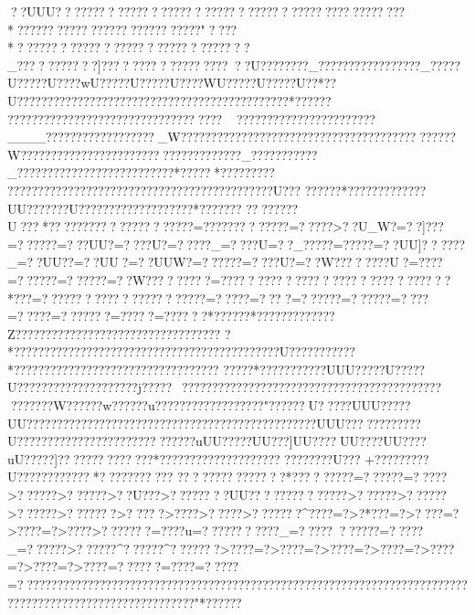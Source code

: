 {{{{{{{{{{{{{{{{{{{{{{{{{{{{{{{{{{{{{{{{{{{{{{{{{{{{{{{{{{{{{{{{{{{{{{{{{{{{{{{{{{{{{{{{{{{{{{{{{{{{{{{{{{{{{{{{{{{{{{{{{{{{{{{{{{{{{{{{{{{{{{{{{{{{{{{{{{{{{{{{{{{{{{{{{{{{{{{{{{{{{{{{{{{{{{{{{{{{{{{{{{{{{{{{{{{{{{{{{{{{{{{{{{{{{{{{{{{{{{{{{{{{{{{{{{{{{{{{{{{{{{{{{{{{{{{{{{{{{{{{{{{{{{{{{{{{{{{{{{{{{{{{{{{{{{{{{{{{{{{{{{{{{{{{{{{{{{{{{{{{{{{{{{{{{{{{{{{{{{{{{{{{{{{{{{{{{{{{{{{{{{{{{{{{{{{{{{{{{{{{{{{{{{{{{{{{{{{{{{{{{{{{{{{{{{{{{{{{{{{{{{{{{{{{{{{{{{{{{{{{{{{{{{{{{{{{{{{{{{{{{{{{{{{{{{{{{{{{{{{{{{{{{{{{{{{{{{{{{{{{{{{{{{{{{{{{{{{{{{{{{{{{{{{{{{{{{{{{{{{{{{{{{{{{{{{{{{{{{{{{{{{{{{{{{{{{{{{{{{{{{{{{{{{{{{{{{{{{{{{{{{{{{{{{ ??UUU?????????????????????????????????????????  ????? ???*  ????????????????????????????"????*????????????????????????????????_???????????]?????????????????? ??U????????_?????????????????_?????U?????U????wU?????U?????U????WU?????U?????U??*??U????????? ???????? ????????????????????????????*??????
????? ?????????????????????????????????????????????????????____??????????????????_W???? ?????????????????????????????????????????W????????????????????????????????????_???????????_?????????????????  ?????  ????*?????*???? ????? 
????  ????  ????  ????  ???? ????? ?????  ??????????????U???
?????? *????? ????????UU???????U???? ???????????????*??????? 
????????U???*?????????????????????=?????????????=?????>??U_W?=??]???=??????=???UU?=????U?=?????_=????}U=??_?????=?????=??UU]??????_=??UU??=??UU?=??UUW?=??????=????U?=??W????????U?=????=??????=??????=??W?????????=???????????????????????????????*???=???????????????????????=?????=???
?=??????=??????=????=?????=???????=?????=??????*??????*?????????????Z?????????????????????????????????? ?*???   ?????????????????????????????????????????U???????????*??????????????????????????????????
?????  *???????????UUU?????U?????U????????????????????j?????~???? ??????????????????????? ???????????????????????W??????w??????u???? ??????????????"??????U?????UUU?????UU????????????????????????????????????????????????UUU????????????U??????????????????????? ??????uUU?????UU???]UU????UU????UU????uU?????]??????? ????  ???*???????????????????? 
????????U???
+?????????U???????????? *??????????? 
???????????????*?????????=??????=?????>??????>??????>??U???>????????UU??????????????>??????>??????>??????>???????>? ????>????>?????>???????^????=?>?*???=?>????=?>????=?>????>???????=????u=???????????_=???????????=?????_=??????>??????^??????^???????>????=?>????=?>????=?>????=?>????=?>????=?>????=??????=????=?????=?????????????????????????????????????????????????????????????????????????????????????????????????????????"*??????  
}}}}}}}}}}}}}}}}}}}}}}}}}}}}}}}}}}}}}}}}}}}}}}}}}}}}}}}}}}}}}}}}}}}}}}}}}}}}}}}}}}}}}}}}}}}}}}}}}}}}}}}}}}}}}}}}}}}}}}}}}}}}}}}}}}}}}}}}}}}}}}}}}}}}}}}}}}}}}}}}}}}}}}}}}}}}}}}}}}}}}}}}}}}}}}}}}}}}}}}}}}}}}}}}}}}}}}}}}}}}}}}}}}}}}}}}}}}}}}}}}}}}}}}}}}}}}}}}}}}}}}}}}}}}}}}}}}}}}}}}}}}}}}}}}}}}}}}}}}}}}}}}}}}}}}}}}}}}}}}}}}}}}}}}}}}}}}}}}}}}}}}}}}}}}}}}}}}}}}}}}}}}}}}}}}}}}}}}}}}}}}}}}}}}}}}}}}}}}}}}}}}}}}}}}}}}}}}}}}}}}}}}}}}}}}}}}}}}}}}}}}}}}}}}}}}}}}}}}}}}}}}}}}}}}}}}}}}}}}}}}}}}}}}}}}}}}}}}}}}}}}}}}}}}}}}}}}}}}}}}}}}}}}}}}}}}}}}}}}}}}}}}}}}}}}}}}}}}}}}}}}}}}}}}}}}}}}}}}}}}}}}}}}}}}}}}}}}}}}}}}}}}}}}}}}}}}}}}}}}}}}}}}}}
